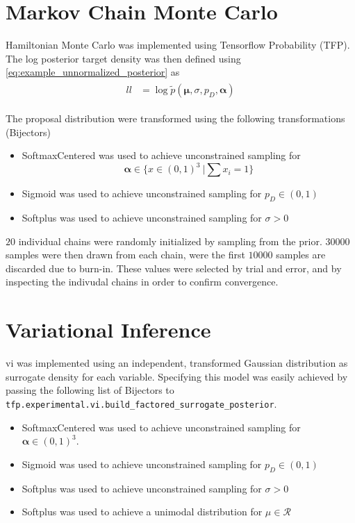 \section{Markov Chain Monte Carlo}
Hamiltonian Monte Carlo was implemented using Tensorflow Probability (TFP). The log posterior target density was then defined using \cref{eq:example_unnormalized_posterior} as 
\begin{align}\label{eq:example_ll}
\begin{split}
    ll &= \log \tilde{p}(\boldsymbol{\mu}, \sigma, p_D, \boldsymbol{\alpha})
\end{split}
\end{align}


The proposal distribution were transformed using the following transformations (Bijectors)

\begin{itemize}
\item SoftmaxCentered was used to achieve unconstrained sampling for $$\boldsymbol{\alpha} \in \{x \in (0, 1)^3\ | \sum x_i = 1\}$$
\item Sigmoid was used to achieve unconstrained sampling for $p_D \in (0, 1)$
\item Softplus was used to achieve unconstrained sampling for $\sigma > 0$
\end{itemize}

$20$ individual chains were randomly initialized by sampling from the prior. $30000$ samples were then drawn from each chain, were the first $10000$ samples are discarded due to burn-in. These values were selected by trial and error, and by inspecting the indivudal chains in order to confirm convergence.  

\section{Variational Inference}

\acrshort{vi} was implemented using an independent, transformed Gaussian distribution as surrogate density for each variable. Specifying this model was easily achieved by passing the following list of Bijectors to \texttt{tfp.experimental.vi.build\_factored\_surrogate\_posterior}. 
\begin{itemize}
\item SoftmaxCentered was used to achieve unconstrained sampling for $\boldsymbol{\alpha} \in (0, 1)^3$.
\item Sigmoid was used to achieve unconstrained sampling for $p_D \in (0, 1)$
\item Softplus was used to achieve unconstrained sampling for $\sigma > 0$
\item Softplus was used to achieve a unimodal distribution for $\mu \in \mathcal{R}$
\end{itemize}

